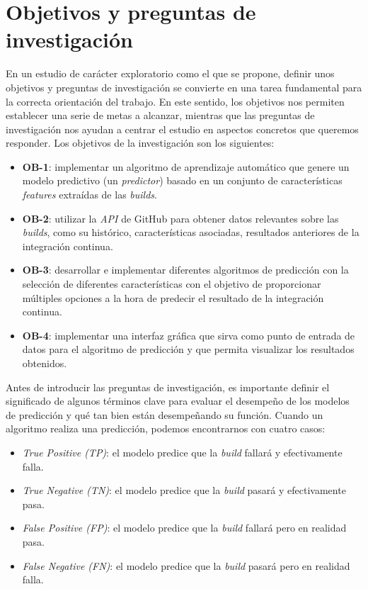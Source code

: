\section{Objetivos y preguntas de investigación}
En un estudio de carácter exploratorio como el que se propone, definir unos objetivos y preguntas
de investigación se convierte en una tarea fundamental para la correcta orientación del trabajo.
En este sentido, los objetivos nos permiten establecer una serie de metas a alcanzar, mientras
que las preguntas de investigación nos ayudan a centrar el estudio en aspectos concretos que
queremos responder. Los objetivos de la investigación son los siguientes:

\begin{itemize}
    \item \textbf{OB-1}: implementar un algoritmo de aprendizaje automático que genere un modelo
          predictivo (un \textit{predictor}) basado en un conjunto de características
          \textit{features} extraídas de las \textit{builds}.\\
    \item \textbf{OB-2}: utilizar la \textit{API} de GitHub para obtener datos relevantes sobre
          las \textit{builds}, como su histórico, características asociadas, resultados anteriores
          de la integración continua.\\
    \item \textbf{OB-3}: desarrollar e implementar diferentes algoritmos de predicción con la
          selección de diferentes características con el objetivo de proporcionar múltiples
          opciones a la hora de predecir el resultado de la integración continua.\\
    \item \textbf{OB-4}: implementar una interfaz gráfica que sirva como punto de entrada de
          datos para el algoritmo de predicción y que permita visualizar los resultados
          obtenidos.
\end{itemize}

Antes de introducir las preguntas de investigación, es importante definir el significado de
algunos términos clave para evaluar el desempeño de los modelos de predicción y qué tan bien
están desempeñando su función. Cuando un algoritmo realiza una predicción, podemos encontrarnos
con cuatro casos:

\begin{itemize}
      \item \textit{True Positive (TP)}: el modelo predice que la \textit{build} fallará y
            efectivamente falla.\\
      \item \textit{True Negative (TN)}: el modelo predice que la \textit{build} pasará y
            efectivamente pasa.\\
      \item \textit{False Positive (FP)}: el modelo predice que la \textit{build} fallará pero
            en realidad pasa.\\
      \item \textit{False Negative (FN)}: el modelo predice que la \textit{build} pasará pero
            en realidad falla.
\end{itemize}



